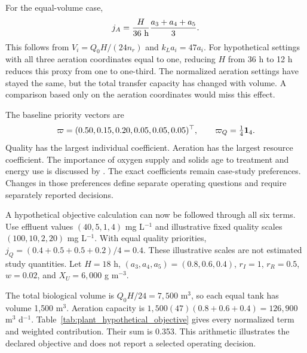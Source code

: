 For the equal-volume case,
\begin{equation}
\equationname{Aeration objective for the illustrative equal-volume reactor train}
j_A=\frac{H}{36\ \mathrm{h}}\frac{a_3+a_4+a_5}{3}.
\label{eq:plant_aeration_proxy_example}
\end{equation}
This follows from $V_i=Q_0H/(24n_r)$ and $k_La_i=47a_i$. For hypothetical settings with all three aeration coordinates equal to one, reducing $H$ from 36 h to 12 h reduces this proxy from one to one-third. The normalized aeration settings have stayed the same, but the total transfer capacity has changed with volume. A comparison based only on the aeration coordinates would miss this effect.

The baseline priority vectors are
\begin{equation}
\equationname{Declared engineering and effluent-quality priority vectors}
\varpi=(0.50,0.15,0.20,0.05,0.05,0.05)^\top,\qquad
\varpi_Q=\tfrac14\mathbf1_4.
\label{eq:plant_objective_priorities}
\end{equation}
Quality has the largest individual coefficient. Aeration has the largest resource coefficient. The importance of oxygen supply and solids age to treatment and energy use is discussed by \citet{Leu2012}. The exact coefficients remain case-study preferences. Changes in those preferences define separate operating questions and require separately reported decisions.

A hypothetical objective calculation can now be followed through all six terms. Use effluent values $(40,5,1,4)$ mg L$^{-1}$ and illustrative fixed quality scales $(100,10,2,20)$ mg L$^{-1}$. With equal quality priorities, $j_Q=(0.4+0.5+0.5+0.2)/4=0.4$. These illustrative scales are not estimated study quantities. Let $H=18$ h, $(a_3,a_4,a_5)=(0.8,0.6,0.4)$, $r_I=1$, $r_R=0.5$, $w=0.02$, and $X_U=6{,}000$ g m$^{-3}$.

The total biological volume is $Q_0H/24=7{,}500$ m$^3$, so each equal tank has volume 1{,}500 m$^3$. Aeration capacity is $1{,}500(47)(0.8+0.6+0.4)=126{,}900$ m$^3$ d$^{-1}$. Table~\ref{tab:plant_hypothetical_objective} gives every normalized term and weighted contribution. Their sum is 0.353. This arithmetic illustrates the declared objective and does not report a selected operating decision.

